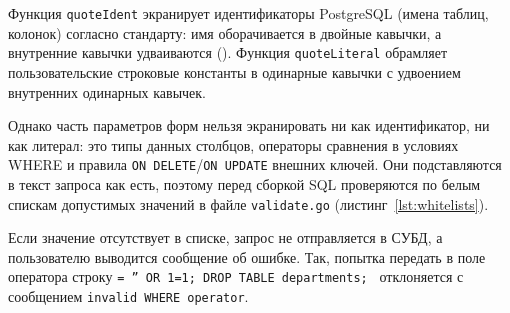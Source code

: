 \begin{listing}[H]
    \caption{Функции экранирования идентификаторов и литералов}
    \label{lst:quote-helpers}
\end{listing}

Функция \texttt{quoteIdent} экранирует идентификаторы PostgreSQL (имена таблиц, колонок) согласно стандарту: имя оборачивается в двойные кавычки, а внутренние кавычки удваиваются (\texttt{}). Функция \texttt{quoteLiteral} обрамляет пользовательские строковые константы в одинарные кавычки с удвоением внутренних одинарных кавычек.

Однако часть параметров форм нельзя экранировать ни как идентификатор, ни как литерал: это типы данных столбцов, операторы сравнения в условиях WHERE и правила \texttt{ON DELETE}/\texttt{ON UPDATE} внешних ключей. Они подставляются в текст запроса как есть, поэтому перед сборкой SQL проверяются по белым спискам допустимых значений в файле \texttt{validate.go} (листинг~\ref{lst:whitelists}).

\begin{listing}[H]
    \caption{Белые списки допустимых значений и функция проверки \texttt{checkAllowed}}
    \label{lst:whitelists}
\end{listing}

Если значение отсутствует в списке, запрос не отправляется в СУБД, а пользователю выводится сообщение об ошибке. Так, попытка передать в поле оператора строку \texttt{= '' OR 1=1; DROP TABLE departments; } отклоняется с сообщением \texttt{invalid WHERE operator}.
